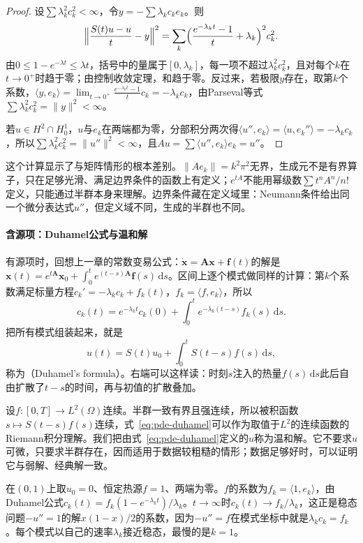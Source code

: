 \begin{proof}
设$\sum\lambda_k^2c_k^2<\infty$，令$y=-\sum\lambda_kc_ke_k$。则
\[
  \Bigl\|\frac{S(t)u-u}{t}-y\Bigr\|^2=\sum_k\Bigl(\frac{e^{-\lambda_kt}-1}{t}+\lambda_k\Bigr)^2c_k^2 .
\]
由$0\leq1-e^{-\lambda t}\leq\lambda t$，括号中的量属于$[0,\lambda_k]$，每一项不超过$\lambda_k^2c_k^2$，且对每个$k$在$t\to0^+$时趋于零；由控制收敛定理，和趋于零。反过来，若极限$y$存在，取第$k$个系数，$\langle y,e_k\rangle=\lim_{t\to0^+}\frac{e^{-\lambda_kt}-1}{t}c_k=-\lambda_kc_k$，由Parseval等式$\sum\lambda_k^2c_k^2=\|y\|^2<\infty$。

若$u\in H^2\cap H_0^1$，$u$与$e_k$在两端都为零，分部积分两次得$\langle u'',e_k\rangle=\langle u,e_k''\rangle=-\lambda_kc_k$，所以$\sum\lambda_k^2c_k^2=\|u''\|^2<\infty$，且$Au=\sum\langle u'',e_k\rangle e_k=u''$。
\end{proof}

这个计算显示了与矩阵情形的根本差别。$\|Ae_k\|=k^2\pi^2$无界，生成元不是有界算子，只在足够光滑、满足边界条件的函数上有定义；$e^{tA}$不能用幂级数$\sum t^nA^n/n!$定义，只能通过半群本身来理解。边界条件藏在定义域里：Neumann条件给出同一个微分表达式$u''$，但定义域不同，生成的半群也不同。

\paragraph{含源项：Duhamel公式与温和解}
有源项时，回想上一章的常数变易公式：$\dot{\bm x}=\bm A\bm x+\bm f(t)$的解是$\bm x(t)=e^{t\bm A}\bm x_0+\int_0^te^{(t-s)\bm A}\bm f(s)\,\mathrm ds$。区间上逐个模式做同样的计算：第$k$个系数满足标量方程$c_k'=-\lambda_kc_k+f_k(t)$，$f_k=\langle f,e_k\rangle$，所以
\[
  c_k(t)=e^{-\lambda_kt}c_k(0)+\int_0^te^{-\lambda_k(t-s)}f_k(s)\,\mathrm ds .
\]
把所有模式组装起来，就是
\begin{equation}
  u(t)=S(t)u_0+\int_0^tS(t-s)f(s)\,\mathrm ds ,
  \label{eq:pde-duhamel}
\end{equation}
称为（Duhamel's formula）。右端可以这样读：时刻$s$注入的热量$f(s)\,\mathrm ds$此后自由扩散了$t-s$的时间，再与初值的扩散叠加。

设$f:[0,T]\to L^2(\Omega)$连续。半群一致有界且强连续，所以被积函数$s\mapsto S(t-s)f(s)$连续，式~\eqref{eq:pde-duhamel}可以作为取值于$L^2$的连续函数的Riemann积分理解。我们把由式~\eqref{eq:pde-duhamel}定义的$u$称为温和解。它不要求$u$可微，只要求半群存在，因而适用于数据较粗糙的情形；数据足够好时，可以证明它与弱解、经典解一致。

\begin{example}[恒定热源下趋于稳态]
\label{ex:pde-heat-steady-source}
在$(0,1)$上取$u_0=0$、恒定热源$f=1$、两端为零。$f$的系数为$f_k=\langle1,e_k\rangle$，由Duhamel公式$c_k(t)=f_k(1-e^{-\lambda_kt})/\lambda_k$。$t\to\infty$时$c_k(t)\to f_k/\lambda_k$，这正是稳态问题$-u''=1$的解$x(1-x)/2$的系数，因为$-u''=f$在模式坐标中就是$\lambda_kc_k=f_k$。每个模式以自己的速率$\lambda_k$接近稳态，最慢的是$k=1$。
\end{example}

